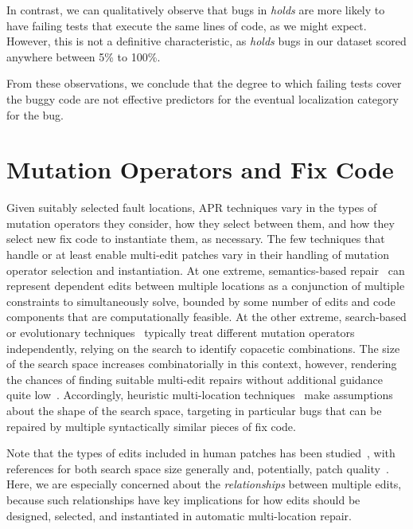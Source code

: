 \documentclass[10pt, conference]{IEEEtran}
\begin{document}
In contrast, we can qualitatively observe that bugs in \emph{holds} are more likely to have 
failing tests that execute the same lines of code, as we might expect. However, this is not a 
definitive characteristic, as \emph{holds} bugs in our dataset scored anywhere between 
5\% to 100\%.

From these observations, we conclude that the degree to which failing tests cover the buggy 
code are not effective predictors for the eventual localization category for the bug. 

\section{Mutation Operators and Fix Code}
\label{sec:mutops}

Given suitably selected fault locations, APR techniques vary in the types of
mutation operators they consider, how they select between them, and how they
select new fix code to instantiate them, as necessary. 
%
The few techniques that handle or at least enable multi-edit patches vary in their
handling of mutation operator selection and instantiation.  At one
extreme, semantics-based repair~\cite{s3,angelix} can represent dependent edits between multiple
locations as a conjunction of multiple constraints to simultaneously solve,
bounded by some number of edits and code components that are computationally feasible. 
At the other extreme, search-based or
evolutionary techniques~\cite{genprog,par} typically treat different mutation
operators independently, relying on the search to 
identify copacetic combinations.  The size of
the search space increases combinatorially in this context, however, rendering
the chances of finding suitable multi-edit repairs without additional guidance
quite low~\cite{ae,long-search-spaces}. Accordingly, heuristic multi-location
techniques~\cite{saha2019harnessing} make assumptions about the 
shape of the search space, 
targeting in particular bugs that can be repaired by multiple syntactically similar pieces of
fix code.

Note that the types of edits included in human patches has been
studied~\cite{examples}, with references for both search space size generally
and, potentially, patch quality~\cite{moreexamples}.  Here, we are especially
concerned about the 
\emph{relationships} between multiple edits, because such relationships have
key implications for how edits should be designed, selected, and instantiated 
in automatic multi-location repair. 
\end{document}
